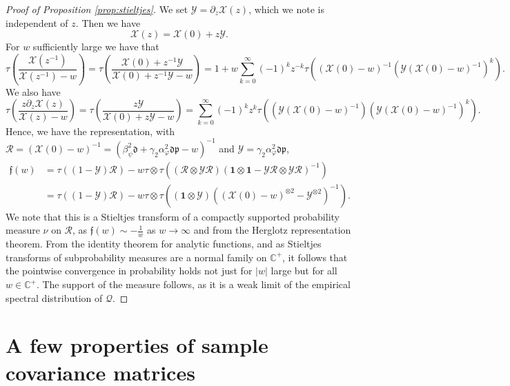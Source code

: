 \documentclass[letterpaper, 10pt, dvipsnames]{article}
\numberwithin{equation}{section}
\newcommand{\C}{\mathbb{C}}
\newcommand{\Q}{\mathcal{Q}}
\newcommand{\R}{\mathcal{R}}
\renewcommand{\phi}{\varphi}
\theoremstyle{definition}
\begin{document}
\begin{proof}[Proof of Proposition \ref{prop:stieltjes}]
We set $\mathcal{Y} = \partial_z \mathcal{X}(z)$, which we note is independent of $z$.  Then we have 
\[
\mathcal{X}(z) = \mathcal{X}(0) + z\mathcal{Y}.
\]
For $w$ sufficiently large we have that 
\[
\tau \left( \frac{\mathcal{X}(z^{-1})}{\mathcal{X}(z^{-1})- w} \right) 
=
\tau \left( \frac{\mathcal{X}(0) + z^{-1}\mathcal{Y}}{\mathcal{X}(0) + z^{-1}\mathcal{Y}- w} \right)
=
1
+
w\sum_{k=0}^\infty (-1)^k z^{-k} \tau\left((\mathcal{X}(0) -w)^{-1} ( \mathcal{Y}(\mathcal{X}(0) -w)^{-1} )^k\right).
\]
We also have 
\[
  \tau \left( \frac{z \partial_z \mathcal{X}(z)}{\mathcal{X}(z)- w}  \right)
  =
  \tau \left( \frac{z \mathcal{Y}}{\mathcal{X}(0) + z\mathcal{Y}- w}  \right)
  =
  \sum_{k=0}^\infty (-1)^k z^{k} \tau\left(( \mathcal{Y}(\mathcal{X}(0) -w)^{-1} )( \mathcal{Y}(\mathcal{X}(0) -w)^{-1} )^{k}\right).
\]
Hence, we have the representation, with $\mathcal{R} = (\mathcal{X}(0)-w)^{-1} = (\beta_\psi^2 \mathfrak{d} + {\gamma_2\alpha_\phi^2} \mathfrak{d}\mathfrak{p}-w)^{-1}$
and $\mathcal{Y} = {\gamma_2\alpha_\phi^2} \mathfrak{d}\mathfrak{p}$,
\begin{equation}\label{eq:frepresentation}
\begin{aligned}
\mathfrak{f}(w)
&=
\tau\left(
    (1-\mathcal{Y})\mathcal{R}
\right)
-w
\tau\otimes\tau \left(
(\mathcal{R} \otimes \mathcal{Y}\mathcal{R})
(\mathbf{1} \otimes \mathbf{1} - \mathcal{Y}\mathcal{R} \otimes \mathcal{Y}\mathcal{R})^{-1}
\right) \\
&=
\tau\left(
  (1-\mathcal{Y})\mathcal{R}
\right)
-w
\tau\otimes\tau \left(
(\mathbf{1} \otimes \mathcal{Y})
( (\mathcal{X}(0)-w)^{\otimes 2} - \mathcal{Y}^{\otimes 2})^{-1}
\right).
\end{aligned}
\end{equation}
We note that this is a Stieltjes transform of a compactly supported probability measure $\nu$ on $\R$, as $\mathfrak{f}(w) \sim -\frac{1}{w}$ as $w \to \infty$ and from the Herglotz representation theorem.  From the identity theorem for analytic functions, and as Stieltjes transforms of subprobability measures are a normal family on $\C^+$, it follows that the pointwise convergence in probability holds not just for $|w|$ large but for all $w \in \C^+$.  The support of the measure follows, as it is a weak limit of the empirical spectral distribution of $\Q$.
\end{proof}

\appendix

\section{ A few properties of sample covariance matrices }
\end{document}
